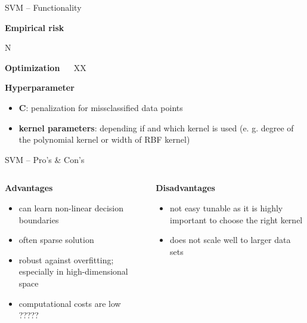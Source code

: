 \documentclass[11pt,compress,t,notes=noshow, xcolor=table]{beamer}
\newcommand{\highlight}[1]{\textcolor{highlightcol}{\textbf{#1}}}
\newcommand{\positem}{\item[$\highlight{+}$]}
\newcommand{\negitem}{\item[$\highlight{-}$]}
\begin{document}

\begin{frame}{SVM -- Functionality}

\footnotesize

\highlight{Empirical risk}

N

\medskip

\highlight{Optimization} ~~
XX

\medskip

\highlight{Hyperparameter}

\begin{itemize}
  \item \textbf{C}: penalization for missclassified data points 
  \item \textbf{kernel parameters}: depending if and which kernel is used (e. g. degree of the polynomial kernel or width of RBF kernel)

\end{itemize}

\end{frame}


\begin{frame}{SVM -- Pro's \& Con's}

\footnotesize


\begin{columns}[onlytextwidth]
  \begin{column}{0.5\textwidth}
    \highlight{Advantages}
    \footnotesize
    \begin{itemize}
      \positem can learn non-linear decision boundaries
      \positem often sparse solution
      \positem robust against overfitting; especially in high-dimensional space 
      \positem computational costs are low ????? 
    \end{itemize}
  \end{column}

  \begin{column}{0.5\textwidth}
    \highlight{Disadvantages}
    \footnotesize
    \begin{itemize}
      \negitem not easy tunable as it is highly important to choose the right kernel
      \negitem does not scale well to larger data sets
    \end{itemize}
  \end{column}
\end{columns}

\vfill

\small


\end{frame}
\end{document}
